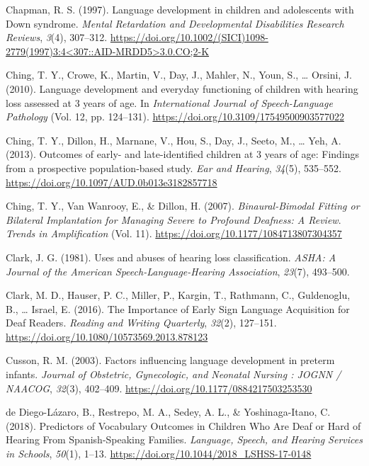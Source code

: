 \documentclass[english,man,floatsintext]{apa6}
\begin{document}
\leavevmode\hypertarget{ref-chapman1997}{}%
Chapman, R. S. (1997). Language development in children and adolescents with Down syndrome. \emph{Mental Retardation and Developmental Disabilities Research Reviews}, \emph{3}(4), 307--312. \href{https://doi.org/10.1002/(SICI)1098-2779(1997)3:4\%3C307::AID-MRDD5\%3E3.0.CO;2-K}{https://doi.org/10.1002/(SICI)1098-2779(1997)3:4\textless{}307::AID-MRDD5\textgreater{}3.0.CO;2-K}

\leavevmode\hypertarget{ref-ching2010}{}%
Ching, T. Y., Crowe, K., Martin, V., Day, J., Mahler, N., Youn, S., \ldots{} Orsini, J. (2010). Language development and everyday functioning of children with hearing loss assessed at 3 years of age. In \emph{International Journal of Speech-Language Pathology} (Vol. 12, pp. 124--131). \url{https://doi.org/10.3109/17549500903577022}

\leavevmode\hypertarget{ref-ching2013}{}%
Ching, T. Y., Dillon, H., Marnane, V., Hou, S., Day, J., Seeto, M., \ldots{} Yeh, A. (2013). Outcomes of early- and late-identified children at 3 years of age: Findings from a prospective population-based study. \emph{Ear and Hearing}, \emph{34}(5), 535--552. \url{https://doi.org/10.1097/AUD.0b013e3182857718}

\leavevmode\hypertarget{ref-ching2007}{}%
Ching, T. Y., Van Wanrooy, E., \& Dillon, H. (2007). \emph{Binaural-Bimodal Fitting or Bilateral Implantation for Managing Severe to Profound Deafness: A Review}. \emph{Trends in Amplification} (Vol. 11). \url{https://doi.org/10.1177/1084713807304357}

\leavevmode\hypertarget{ref-clark1981}{}%
Clark, J. G. (1981). Uses and abuses of hearing loss classification. \emph{ASHA: A Journal of the American Speech-Language-Hearing Association}, \emph{23}(7), 493--500.

\leavevmode\hypertarget{ref-clark2016}{}%
Clark, M. D., Hauser, P. C., Miller, P., Kargin, T., Rathmann, C., Guldenoglu, B., \ldots{} Israel, E. (2016). The Importance of Early Sign Language Acquisition for Deaf Readers. \emph{Reading and Writing Quarterly}, \emph{32}(2), 127--151. \url{https://doi.org/10.1080/10573569.2013.878123}

\leavevmode\hypertarget{ref-cusson2003}{}%
Cusson, R. M. (2003). Factors influencing language development in preterm infants. \emph{Journal of Obstetric, Gynecologic, and Neonatal Nursing : JOGNN / NAACOG}, \emph{32}(3), 402--409. \url{https://doi.org/10.1177/0884217503253530}

\leavevmode\hypertarget{ref-dediego-lazaro2018}{}%
de Diego-Lázaro, B., Restrepo, M. A., Sedey, A. L., \& Yoshinaga-Itano, C. (2018). Predictors of Vocabulary Outcomes in Children Who Are Deaf or Hard of Hearing From Spanish-Speaking Families. \emph{Language, Speech, and Hearing Services in Schools}, \emph{50}(1), 1--13. \url{https://doi.org/10.1044/2018_LSHSS-17-0148}
\end{document}

